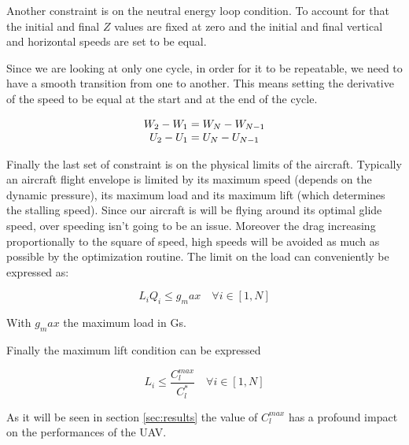 \par Another constraint is on the neutral energy loop condition.
To account for that the initial and final $Z$ values are fixed at zero and the initial and final vertical and horizontal speeds are set to be equal.

\par Since we are looking at only one cycle, in order for it to be repeatable, we need to have a smooth transition from one to another.
This  means setting the derivative of the speed to be equal at the start and at the end of the cycle.

\begin{equation}
	\begin{array}[c]{c}
		W_2 - W_1 = W_N - W_{N-1} \\
		U_2 - U_1 = U_N - U_{N-1} 
	\end{array}
	\label{eqn:derivative_constraint}
\end{equation}

\par Finally the last set of constraint is on the physical limits of the aircraft.
Typically an aircraft flight envelope is limited by its maximum speed (depends on the dynamic pressure), its maximum load and its maximum lift (which determines the stalling speed).
Since our aircraft is will be flying around its optimal glide speed, over speeding isn't going to be an issue.
Moreover the drag increasing proportionally to the square of speed, high speeds will be avoided as much as possible by the optimization routine.
The limit on the load can conveniently be expressed as:

\begin{equation}
	L_i Q_i \leq g_max \quad \forall i \in [1,N]
	\label{eqn:load_constraint}
\end{equation}

With $g_max$ the maximum load in Gs.


\par Finally the maximum lift condition can be expressed

\begin{equation}
	L_i \le \frac{C_l^{max}}{C_l^*} \quad \forall i \in [1,N]
	\label{eqn:lift_constraint}
\end{equation}

As it will be seen in section \ref{sec:results} the value of $C_l^{max}$ has a profound impact on the performances of the UAV.

